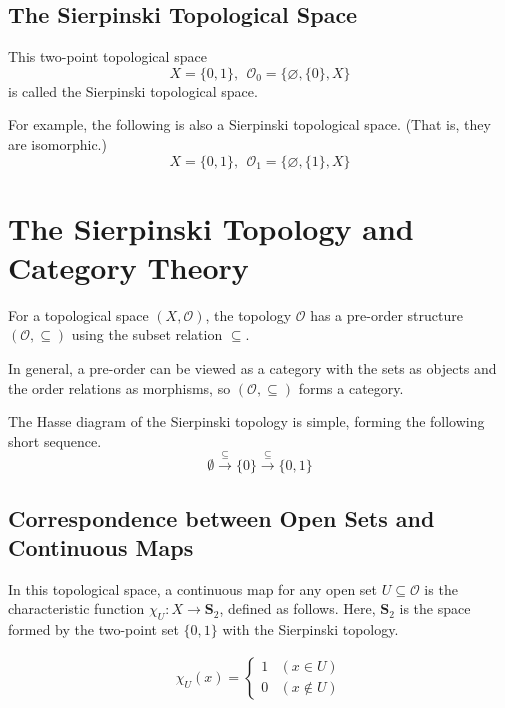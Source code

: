 \documentclass{article}
\begin{document}
\subsection{The Sierpinski Topological Space}

This two-point topological space
$$X = \{0, 1\} , \ \ \mathcal{O}_{0} = \{\varnothing, \{0\}, X\}$$
is called the Sierpinski topological space.

For example, the following is also a Sierpinski topological space. (That is, they are isomorphic.)
$$X = \{0, 1\} , \ \ \mathcal{O}_{1} = \{\varnothing, \{1\}, X\}$$



\section{The Sierpinski Topology and Category Theory}

For a topological space $(X, \mathcal{O})$, the topology $\mathcal{O}$ has a pre-order structure $(\mathcal{O}, \subseteq )$ using the subset relation $\subseteq$.

In general, a pre-order can be viewed as a category with the sets as objects and the order relations as morphisms, so $(\mathcal{O}, \subseteq )$ forms a category.

The Hasse diagram of the Sierpinski topology is simple, forming the following short sequence.
$$
	\emptyset \xrightarrow{\subseteq} \{0\} \xrightarrow{\subseteq} \{0, 1\}
$$

\subsection{Correspondence between Open Sets and Continuous Maps}

In this topological space, a continuous map for any open set $U \subseteq \mathcal{O}$ is the characteristic function $\chi_{U}: X \to \mathbf{S}_ {2}$, defined as follows.
Here, $\mathbf{S}_ {2}$ is the space formed by the two-point set $\{0,1\}$ with the Sierpinski topology.

\begin{align*}
	\chi_{U}(x) =
	\begin{cases}
		1 & (x \in U)    \\
		0 & (x \notin U)
	\end{cases}
\end{align*}
\end{document}
